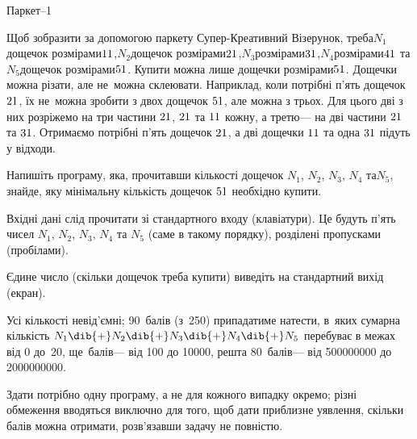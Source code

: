 \begin{problemAllDefault}{Паркет--1}

{

Щоб зобразити за допомогою паркету Супер-Креативний Візерунок, треба\linebreak[1]
$N_1$\nolinebreak[3] дощечок розмірами\nolinebreak[2] $1{\*}1$,\linebreak[1]
$N_2$\nolinebreak[3] дощечок розмірами\nolinebreak[2] $2{\*}1$,\linebreak[1]
$N_3$\nolinebreak[3] розмірами\nolinebreak[1] $3{\*}1$,\linebreak[1]
$N_4$\nolinebreak[4] розмірами\nolinebreak[1] $4{\*}1$ та 
$N_5$\nolinebreak[3] дощечок розмірами\nolinebreak[3] $5{\*}1$. 
Купити можна лише дощечки розмірами\nolinebreak[2] $5{\*}1$. Дощечки можна різати, але не~можна склеювати. Наприклад, коли потрібні п’ять дощечок $2{\*}1$, їх не~можна зробити з двох дощечок $5{\*}1$, але можна з трьох. Для цього дві з них розріжемо на три частини $2{\*}1$, $2{\*}1$ та $1{\*}1$ кожну, а третю\nolinebreak[3] --- на дві частини $2{\*}1$ та $3{\*}1$. Отримаємо потрібні п’ять дощечок $2{\*}1$, а дві дощечки $1{\*}1$ та одна $3{\*}1$ підуть у відходи.

}

Напишіть програму, яка, прочитавши кількості дощечок $N_1$, $N_2$, $N_3$, $N_4$ та\nolinebreak[3] $N_5$, знайде, яку мінімальну кількість дощечок $5{\*}1$ необхідно купити.

\InputFile	Вхідні дані слід прочитати зі стандартного входу (клавіатури). Це будуть п’ять чисел $N_1$, $N_2$, $N_3$, $N_4$ та $N_5$ (саме в такому порядку), розділені пропусками (пробілами).

\OutputFile	Єдине число (скільки дощечок треба купити) виведіть на стандартний вихід (екран).

\ifAfour\vspace{-0.5\baselineskip}\fi

\Examples
\begin{exampleSimple}{5em}{3em}%
%
\end{exampleSimple}
\begin{exampleSimple}{5em}{3em}%
%
\end{exampleSimple}

\Scoring	Усі кількості невід’ємні; 90~балів (з~250) припадатиме на\nolinebreak[3] тести, в~яких сумарна кількість $N_1\dib{{+}}N_2\dib{{+}}N_3\dib{{+}}N_4\dib{{+}}N_5$ перебуває в межах від 0 до~20, ще~балів\nolinebreak[3] --- від 100 до \mbox{10\hspace{0.125em}000}, решта 80~балів\nolinebreak[3] --- від \mbox{500\hspace{0.125em}000\hspace{0.125em}000} до \mbox{2\hspace{0.125em}000\hspace{0.125em}000\hspace{0.125em}000}. 

Здати потрібно одну програму, а не для кожного випадку окремо; різні обмеження вводяться виключно для того, щоб дати приблизне уявлення, скільки балів можна отримати, розв’язавши задачу не повністю.



\end{problemAllDefault}